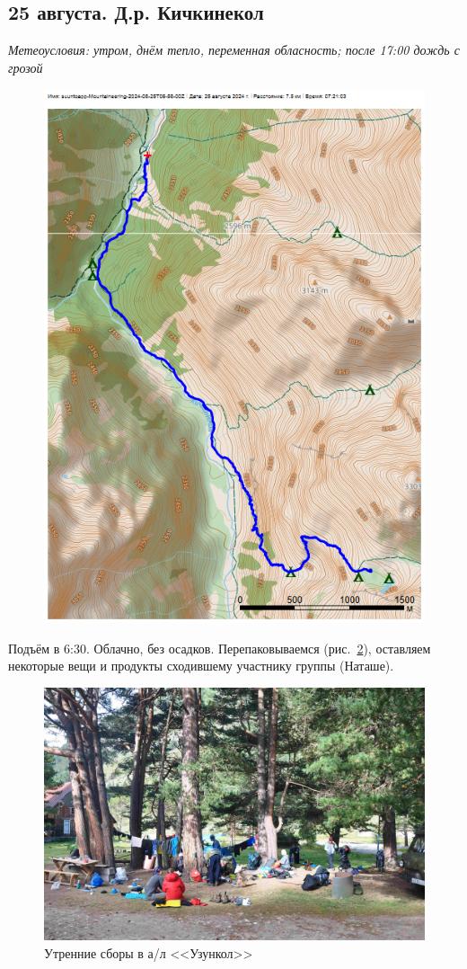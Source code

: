 \subsection{25 августа. Д.р. Кичкинекол}
\textit{Метеоусловия: утром, днём тепло, переменная обласность; после 17:00 дождь с грозой}

\begin{figure}[h!]
	\centering
	\includegraphics[angle=0, width=0.7\linewidth]{../pics/mini_maps/25}
	\label{fig:mini_25}
\end{figure}

Подъём в 6:30. Облачно, без осадков. Перепаковываемся (рис.~\ref{fig:DSC_0126.JPG}), оставляем некоторые вещи и продукты сходившему участнику группы (Наташе). 

\begin{figure}[h!]
	\centering
	\includegraphics[width=0.7\linewidth]{../pics/DSC_0126.JPG}
	\caption{Утренние сборы в а/л <<Узункол>>}
	\label{fig:DSC_0126.JPG}
\end{figure}

